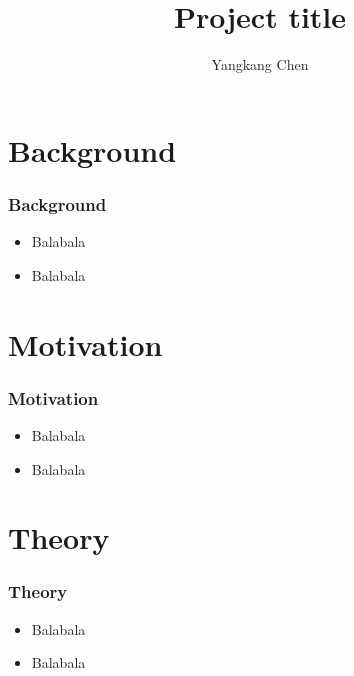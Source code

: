 \title[projname]{Project title}
\author[Y. Chen]{Yangkang Chen}
\newcommand{\centered}[1]{\begin{center} #1 \end{center}}


\begin{frame}
  \titlepage
\end{frame}

\section{Background}
\begin{frame}\frametitle{Background}
\begin{center}
\begin{itemize}
\item Balabala
\item Balabala
\end{itemize}
\end{center}
\end{frame}

\section{Motivation}
\begin{frame}\frametitle{Motivation}
\begin{center}
\begin{itemize}
\item Balabala
\item Balabala
\end{itemize}
\end{center}
\end{frame}


\section{Theory}
\begin{frame}\frametitle{Theory}
\begin{itemize}
\item Balabala
\item Balabala
\end{itemize}
\end{frame}

